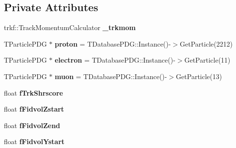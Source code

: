 \subsection*{Private Attributes}
\begin{DoxyCompactItemize}
\item 
\hypertarget{classselection_1_1CC0piNpSelection_a82c14d3fa8ea4b3edff07521b2f7c1b9}{trkf\-::\-Track\-Momentum\-Calculator {\bfseries \-\_\-trkmom}}\label{classselection_1_1CC0piNpSelection_a82c14d3fa8ea4b3edff07521b2f7c1b9}

\item 
\hypertarget{classselection_1_1CC0piNpSelection_a721706e2b68efe51225fa6388bc184d1}{T\-Particle\-P\-D\-G $\ast$ {\bfseries proton} = T\-Database\-P\-D\-G\-::\-Instance()-\/$>$Get\-Particle(2212)}\label{classselection_1_1CC0piNpSelection_a721706e2b68efe51225fa6388bc184d1}

\item 
\hypertarget{classselection_1_1CC0piNpSelection_ad04f8899cec1c9c54e720126e61a872f}{T\-Particle\-P\-D\-G $\ast$ {\bfseries electron} = T\-Database\-P\-D\-G\-::\-Instance()-\/$>$Get\-Particle(11)}\label{classselection_1_1CC0piNpSelection_ad04f8899cec1c9c54e720126e61a872f}

\item 
\hypertarget{classselection_1_1CC0piNpSelection_ae1161170f7b46e368ad608924cc412fd}{T\-Particle\-P\-D\-G $\ast$ {\bfseries muon} = T\-Database\-P\-D\-G\-::\-Instance()-\/$>$Get\-Particle(13)}\label{classselection_1_1CC0piNpSelection_ae1161170f7b46e368ad608924cc412fd}

\item 
\hypertarget{classselection_1_1CC0piNpSelection_ab72eccf7dab3acafa294a0d8f3e225a0}{float {\bfseries f\-Trk\-Shrscore}}\label{classselection_1_1CC0piNpSelection_ab72eccf7dab3acafa294a0d8f3e225a0}

\item 
\hypertarget{classselection_1_1CC0piNpSelection_afe5a2b82ecad103b98362839094c47e0}{float {\bfseries f\-Fidvol\-Zstart}}\label{classselection_1_1CC0piNpSelection_afe5a2b82ecad103b98362839094c47e0}

\item 
\hypertarget{classselection_1_1CC0piNpSelection_a9ac28bcb4ef95573d416dec35202b18e}{float {\bfseries f\-Fidvol\-Zend}}\label{classselection_1_1CC0piNpSelection_a9ac28bcb4ef95573d416dec35202b18e}

\item 
\hypertarget{classselection_1_1CC0piNpSelection_ac59a66f695af8314018029e4480db16a}{float {\bfseries f\-Fidvol\-Ystart}}\label{classselection_1_1CC0piNpSelection_ac59a66f695af8314018029e4480db16a}


\end{DoxyCompactItemize}
